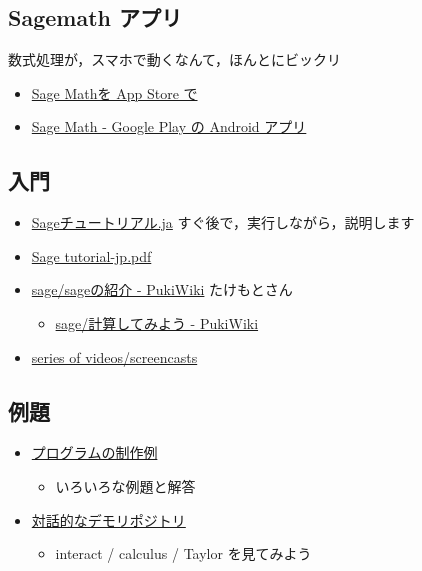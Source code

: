 \documentclass[dvipdfmx,11pt]{jarticle}
\begin{document}
\subsection{Sagemath アプリ}
\label{sec:org0988871}

数式処理が，スマホで動くなんて，ほんとにビックリ

\begin{itemize}
\item \href{https://itunes.apple.com/jp/app/sage-math/id496492945?mt=8}{Sage Mathを App Store で}

\item \href{https://play.google.com/store/apps/details?id=org.sagemath.droid\&hl=ja}{Sage Math - Google Play の Android アプリ}
\end{itemize}

\subsection{入門}
\label{sec:org28873eb}

\begin{itemize}
\item \href{http://doc.sagemath.org/html/ja/tutorial/index.html}{Sageチュートリアル.ja} すぐ後で，実行しながら，説明します

\item \href{http://doc.sagemath.org/pdf/ja/tutorial/tutorial-jp.pdf}{Sage tutorial-jp.pdf}

\item \href{http://www.pwv.co.jp/\%7Etake/TakeWiki/index.php?sage\%2Fsage\%E3\%81\%AE\%E7\%B4\%B9\%E4\%BB\%8B}{sage/sageの紹介 - PukiWiki} たけもとさん

\begin{itemize}
\item \href{http://www.pwv.co.jp/\~take/TakeWiki/index.php?sage\%2F\%E8\%A8\%88\%E7\%AE\%97\%E3\%81\%97\%E3\%81\%A6\%E3\%81\%BF\%E3\%82\%88\%E3\%81\%86}{sage/計算してみよう - PukiWiki}
\end{itemize}

\item \href{http://www.sagemath.org/help-video.html}{series of videos/screencasts}
\end{itemize}

\subsection{例題}
\label{sec:org30e8fae}

\begin{itemize}
\item \href{http://doc.sagemath.org/html/en/constructions/index.html}{プログラムの制作例}
\begin{itemize}
\item いろいろな例題と解答
\end{itemize}

\item \href{https://wiki.sagemath.org/interact}{対話的なデモリポジトリ} 
\begin{itemize}
\item interact / calculus / Taylor  を見てみよう
\end{itemize}
\end{itemize}
\end{document}
